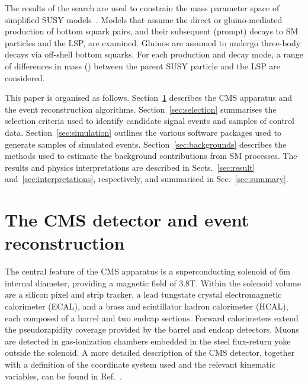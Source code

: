 The results of the search are used to constrain the mass parameter
space of simplified SUSY models~\cite{Alwall:2008ag, Alwall:2008va,
  sms}. Models that assume the direct or gluino-mediated production of
bottom squark pairs, and their subsequent (prompt) decays to SM
particles and the LSP, are examined. Gluinos are assumed to undergo
three-body decays via off-shell bottom squarks. For each production
and decay mode, a range of differences in mass (\dm) between the
parent SUSY particle and the LSP are considered. 

This paper is organised as follows. Section~\ref{sec:reconstruction}
describes the CMS apparatus and the event reconstruction
algorithms. Section~\ref{sec:selection} summarises the selection
criteria used to identify candidate signal events and samples of
control data. Section~\ref{sec:simulation} outlines the various
software packages used to generate samples of simulated
events. Section~\ref{sec:backgrounds} describes the methods used to
estimate the background contributions from SM processes. The results
and physics interpretations are described in Sects.~\ref{sec:result}
and~\ref{sec:interpretations}, respectively, and summarised in
Sec.~\ref{sec:summary}.


\section{The CMS detector and event reconstruction}
\label{sec:reconstruction}

The central feature of the CMS apparatus is a superconducting solenoid
of 6\unit{m} internal diameter, providing a magnetic field of
3.8\unit{T}. Within the solenoid volume are a silicon pixel and strip
tracker, a lead tungstate crystal electromagnetic calorimeter (ECAL),
and a brass and scintillator hadron calorimeter (HCAL), each composed
of a barrel and two endcap sections. Forward calorimeters extend the
pseudorapidity coverage provided by the barrel and endcap
detectors. Muons are detected in gas-ionization chambers embedded in
the steel flux-return yoke outside the solenoid. A more detailed
description of the CMS detector, together with a definition of the
coordinate system used and the relevant kinematic variables, can be
found in Ref.~\cite{Chatrchyan:2008zzk}.


